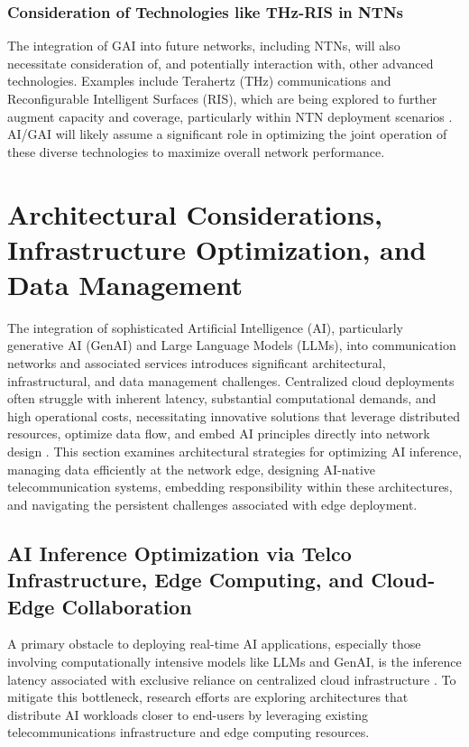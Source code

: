 \documentclass[sigconf]{acmart}
\begin{document}
\subsubsection{Consideration of Technologies like THz-RIS in NTNs} \label{subsubsec:thz_ris}
The integration of GAI into future networks, including NTNs, will also necessitate consideration of, and potentially interaction with, other advanced technologies. Examples include Terahertz (THz) communications and Reconfigurable Intelligent Surfaces (RIS), which are being explored to further augment capacity and coverage, particularly within NTN deployment scenarios \cite{ref10}. AI/GAI will likely assume a significant role in optimizing the joint operation of these diverse technologies to maximize overall network performance.

\section{Architectural Considerations, Infrastructure Optimization, and Data Management}

The integration of sophisticated Artificial Intelligence (AI), particularly generative AI (GenAI) and Large Language Models (LLMs), into communication networks and associated services introduces significant architectural, infrastructural, and data management challenges. Centralized cloud deployments often struggle with inherent latency, substantial computational demands, and high operational costs, necessitating innovative solutions that leverage distributed resources, optimize data flow, and embed AI principles directly into network design \cite{ref14, ref31}. This section examines architectural strategies for optimizing AI inference, managing data efficiently at the network edge, designing AI-native telecommunication systems, embedding responsibility within these architectures, and navigating the persistent challenges associated with edge deployment.

\subsection{AI Inference Optimization via Telco Infrastructure, Edge Computing, and Cloud-Edge Collaboration}

A primary obstacle to deploying real-time AI applications, especially those involving computationally intensive models like LLMs and GenAI, is the inference latency associated with exclusive reliance on centralized cloud infrastructure \cite{ref3, ref14, ref31}. To mitigate this bottleneck, research efforts are exploring architectures that distribute AI workloads closer to end-users by leveraging existing telecommunications infrastructure and edge computing resources.
\end{document}
